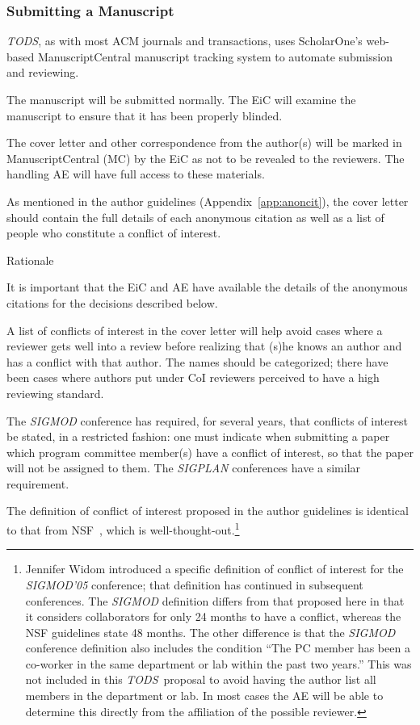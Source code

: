 \documentclass[acmtods,acmnow]{acmtrans2m}
\newcommand{\tods}{{\em TODS\/}}
\begin{document}
\subsubsection{Submitting a Manuscript}
\tods, as with most ACM journals and transactions, uses ScholarOne's
web-based ManuscriptCentral manuscript tracking system to automate
submission and reviewing.

The manuscript will be submitted normally. The EiC will
examine the manuscript to ensure that it has been properly blinded.

The cover letter and other correspondence from the author(s) will be marked
in ManuscriptCentral (MC) by the EiC as not to be revealed to the
reviewers. The handling AE will have full access to
these materials.

As mentioned in the author guidelines (Appendix~\ref{app:anoncit}), the
cover letter should contain the full details of each anonymous citation as
well as a list of people who constitute a conflict of interest.

\noindent
{\sffamily Rationale}

It is important that the EiC and AE have available the details of the
anonymous citations for the decisions described below.

A list of conflicts of interest in the cover letter will help avoid cases
where a reviewer gets well into a review before realizing that (s)he knows
an author and has a conflict with that author. The names should be
categorized; there have been cases where authors put under CoI reviewers 
perceived to have a high reviewing standard.

The {\em SIGMOD} conference has required, for several years, that conflicts
of interest be stated, in a restricted fashion: one must
indicate when submitting a paper which program committee member(s) have a
conflict of interest, so that the paper will not be assigned to them. The
{\em SIGPLAN} conferences have a similar requirement.

The definition of conflict of interest proposed in the author guidelines is identical to that from
NSF~\cite{NSF}, which is well-thought-out.\footnote{Jennifer Widom
introduced a specific definition of conflict of interest for the {\em
SIGMOD'05} conference; that definition has continued in subsequent
conferences. The {\em SIGMOD} definition differs from that proposed here in that it considers
collaborators for only 24 months to have a conflict, whereas the NSF
guidelines state 48 months. The other difference is that the {\em SIGMOD}
conference definition also includes the condition ``The PC member has been a
co-worker in the same department or lab within the past two years.'' This
was not included in this \tods\ proposal to avoid having the author list all
members in the department or lab. In most cases the AE will be able to
determine this directly from the affiliation of the possible reviewer.}
\end{document}
